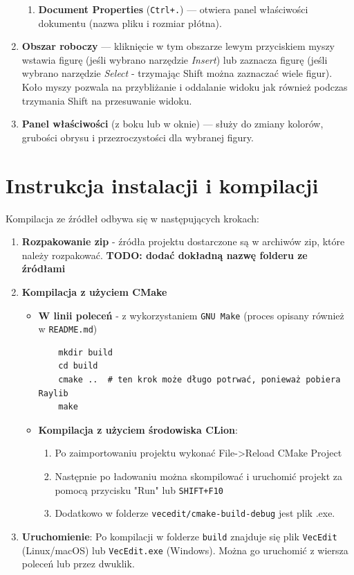 \documentclass[a4paper,12pt]{article}
\begin{document}
\begin{enumerate}
\begin{enumerate}[label=\alph*)]
        \item \textbf{Document Properties} (\texttt{Ctrl+.}) — otwiera panel właściwości dokumentu (nazwa pliku i rozmiar płótna).
    \end{enumerate}
    \item \textbf{Obszar roboczy} — kliknięcie w tym obszarze lewym przyciskiem
      myszy wstawia figurę (jeśli wybrano narzędzie \emph{Insert}) lub zaznacza
      figurę (jeśli wybrano narzędzie \emph{Select} - trzymając Shift można
      zaznaczać wiele figur). Koło myszy pozwala na przybliżanie i oddalanie
      widoku jak również podczas trzymania Shift na przesuwanie widoku.
    \item \textbf{Panel właściwości} (z boku lub w oknie) — służy do zmiany 
    kolorów, grubości obrysu i przezroczystości dla wybranej figury.
\end{enumerate}

\section{Instrukcja instalacji i kompilacji}

Kompilacja ze źródłeł odbywa się w następujących krokach:

\begin{enumerate}
    \item \textbf{Rozpakowanie zip} - źródła projektu dostarczone są w archiwów zip, które należy rozpakować. \textbf{TODO: dodać dokładną nazwę folderu ze źródłami}
    \item \textbf{Kompilacja z użyciem CMake}
    \begin{itemize}
      \item  \textbf{W linii poleceń} - z wykorzystaniem \texttt{GNU Make} (proces opisany również w \texttt{README.md})
    \begin{verbatim}
    mkdir build
    cd build
    cmake ..  # ten krok może długo potrwać, ponieważ pobiera Raylib
    make
    \end{verbatim}
    \item \textbf{Kompilacja z użyciem środowiska CLion}:
        \begin{enumerate}
            \item Po zaimportowaniu projektu wykonać File->Reload CMake Project
            \item Następnie po ładowaniu można skompilować i uruchomić projekt za pomocą 
                przycisku "Run" lub \texttt{SHIFT+F10}
            \item Dodatkowo w folderze \texttt{vecedit/cmake-build-debug} jest
                plik .exe.
        \end{enumerate}
    \end{itemize}
    \item \textbf{Uruchomienie}: Po kompilacji w folderze \texttt{build} znajduje się 
    plik \texttt{VecEdit} (Linux/macOS) lub \texttt{VecEdit.exe} (Windows). 
    Można go uruchomić z wiersza poleceń lub przez dwuklik. 
\end{enumerate}
\end{document}
